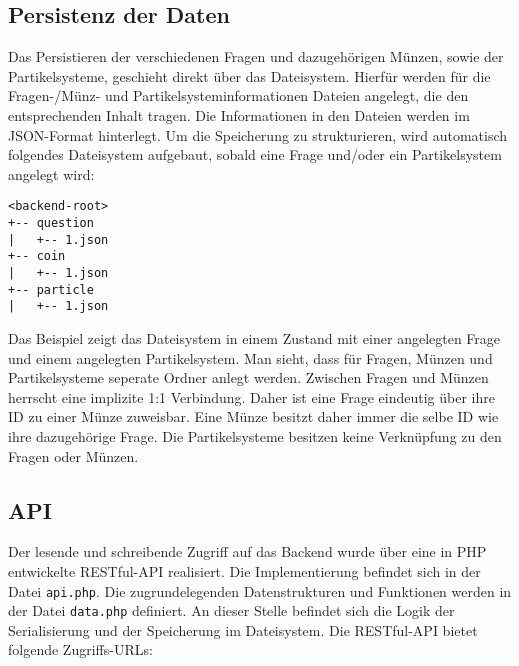 \subsection{Persistenz der Daten}
\label{sub:Persistenz}
Das Persistieren der verschiedenen Fragen und dazugehörigen Münzen, sowie der Partikelsysteme, geschieht direkt über das Dateisystem. Hierfür werden für die Fragen-/Münz- und Partikelsysteminformationen Dateien angelegt, die den entsprechenden Inhalt tragen. Die Informationen in den Dateien werden im JSON-Format hinterlegt.
Um die Speicherung zu strukturieren, wird automatisch folgendes Dateisystem aufgebaut, sobald eine Frage und/oder ein Partikelsystem angelegt wird:

\begin{verbatim}
<backend-root>
+-- question
|   +-- 1.json
+-- coin
|   +-- 1.json
+-- particle
|   +-- 1.json
\end{verbatim}

Das Beispiel zeigt das Dateisystem in einem Zustand mit einer angelegten Frage und einem angelegten Partikelsystem. Man sieht, dass für Fragen, Münzen und Partikelsysteme seperate Ordner anlegt werden. Zwischen Fragen und Münzen herrscht eine implizite 1:1 Verbindung. Daher ist eine Frage eindeutig über ihre ID zu einer Münze zuweisbar. Eine Münze besitzt daher immer die selbe ID wie ihre dazugehörige Frage. Die Partikelsysteme besitzen keine Verknüpfung zu den Fragen oder Münzen.

\subsection{API}
\label{subs:API}
Der lesende und schreibende Zugriff auf das Backend wurde über eine in PHP entwickelte RESTful-API realisiert. Die Implementierung befindet sich in der Datei \texttt{api.php}.
Die zugrundelegenden Datenstrukturen und Funktionen werden in der Datei \texttt{data.php} definiert. An dieser Stelle befindet sich die Logik der Serialisierung und der Speicherung im Dateisystem.
Die RESTful-API bietet folgende Zugriffs-URLs:

